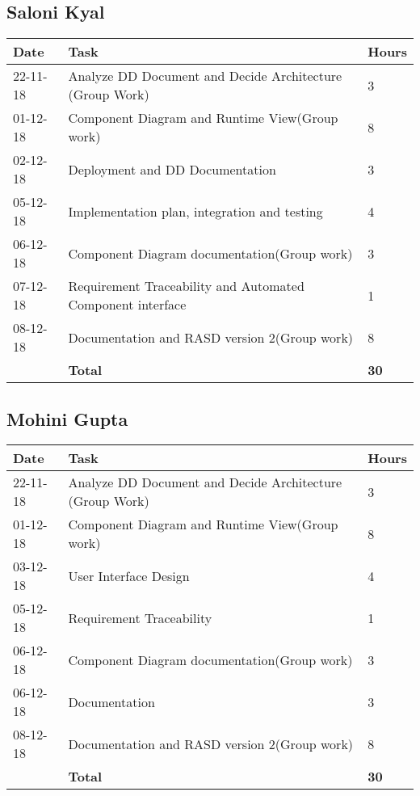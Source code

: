 \subsection{Saloni Kyal}
\begin{table}[H]
	\centering
    \begin{tabular}{|l|l|l|}
    \hline
     \textbf{Date} & \textbf{Task} & \textbf{Hours}\\
    \hline
    22-11-18 & Analyze DD Document and Decide Architecture (Group Work) & 3 \\
    \hline
	01-12-18 &  Component Diagram and Runtime View(Group work) &  8\\
    \hline
    02-12-18 &  Deployment and DD Documentation  &  3\\
    \hline
    05-12-18 &  Implementation plan, integration and testing  &  4\\
    \hline
		06-12-18 & Component Diagram documentation(Group work) & 3\\
        \hline
        07-12-18 & Requirement Traceability and Automated Component interface & 1\\
        \hline
		08-12-18 & Documentation and RASD version 2(Group work) & 8\\
    \hline
	& \textbf{Total}	& \textbf{30}\\   
    \hline
    \end{tabular}
\end{table}

\subsection{Mohini Gupta}
\begin{table}[H]
	\centering
    \begin{tabular}{|l|l|l|}
    \hline
     \textbf{Date} & \textbf{Task} & \textbf{Hours}\\
    \hline
    22-11-18 & Analyze DD Document and Decide Architecture (Group Work) & 3 \\
    \hline
	01-12-18 &  Component Diagram and Runtime View(Group work) &  8\\
    \hline
    03-12-18 &  User Interface Design &  4\\
     \hline
        05-12-18 & Requirement Traceability & 1\\
    \hline
		06-12-18 & Component Diagram documentation(Group work) & 3\\
        \hline
		06-12-18 & Documentation & 3\\
        \hline
		08-12-18 & Documentation and RASD version 2(Group work) & 8 \\
    \hline
	& \textbf{Total}	& \textbf{30}\\   
    \hline
    \end{tabular}
\end{table}


